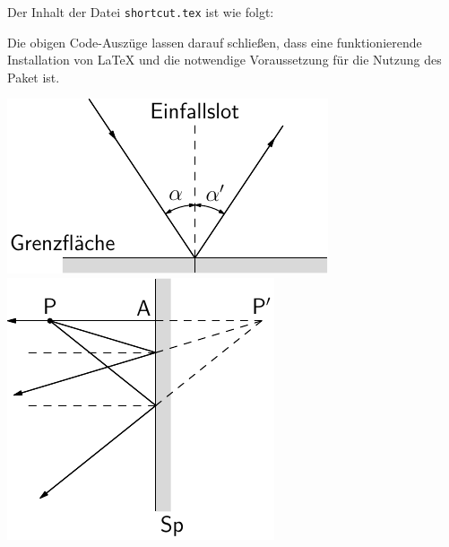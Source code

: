 Der Inhalt der Datei \verb|shortcut.tex| ist wie folgt:

\begin{texcode}
\newcommand{\pLabel}[1]{\mathsf{#1}}
\newcommand{\tLabel}[1]{\textsf{#1}}
\end{texcode}


Die obigen Code-Auszüge lassen darauf schließen, 
dass eine funktionierende Installation von \LaTeX{} und \asypmtote{} die notwendige Voraussetzung für die Nutzung des Paket \optik{} ist.



\includegraphics{asy-img/mirror-simple}
%
\includegraphics{asy-img/mirror-vertical}


